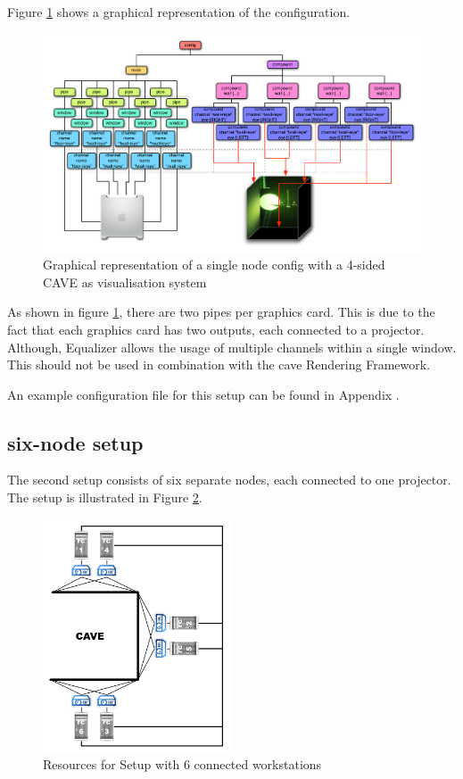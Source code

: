 Figure \ref{fig:1nodeConfig} shows a graphical representation of the configuration. 
\begin{figure}[H]
	\centering
	\includegraphics[width=1\textwidth]{../figures/1nodeConfig}
	\caption{Graphical representation of a single node config with a 4-sided CAVE as visualisation system}
	\label{fig:1nodeConfig}
\end{figure}

As shown in figure \ref{fig:1nodeConfig}, there are two pipes per graphics card. This is due to the fact that each graphics card has two outputs, each connected to a projector. Although, Equalizer allows the usage of multiple channels within a single window. This should not be used in combination with the \gls{cave} Rendering Framework.

An example configuration file for this setup can be found in Appendix .

\subsection{six-node setup}
The second setup consists of six separate nodes, each connected to one projector. The setup is illustrated in Figure \ref{fig:6nodeSetup}.
\begin{figure}[H]
	\centering
	\includegraphics[width=0.5\textwidth]{../figures/6node_architecture}
	\caption{Resources for Setup with 6 connected workstations}
	\label{fig:6nodeSetup}
\end{figure}

